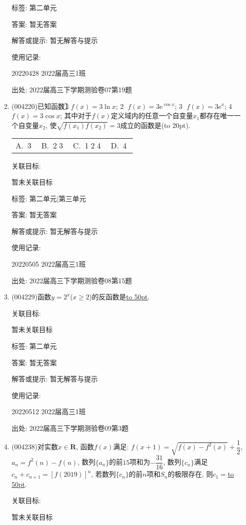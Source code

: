 \documentclass[10pt,a4paper]{article}
\newcommand{\blank}[1]{\underline{\hbox to #1pt{}}}
\newcommand{\bracket}[1]{(\hbox to #1pt{})}
\newcommand{\fourch}[4]{\par\begin{tabular}{p{.23\textwidth}p{.23\textwidth}p{.23\textwidth}p{.23\textwidth}}
A.~#1 &B.~#2& C.~#3& D.~#4
\end{tabular}}
\begin{document}
\begin{enumerate}[1.]
标签: 第二单元

答案: 暂无答案

解答或提示: 暂无解答与提示

使用记录:

20220428	2022届高三1班		


出处: 2022届高三下学期测验卷07第19题
\item { (004220)}已知函数\textcircled{1} $f(x)=3\ln x$; \textcircled{2} $f(x)=3\mathrm{e}^{\cos x}$; \textcircled{3} $f(x)=3\mathrm{e}^x$; \textcircled{4} $f(x)=3\cos x$; 其中对于$f(x)$定义域内的任意一个自变量$x_1$都存在唯一一个自变量$x_2$, 使$\sqrt{f(x_1)f(x_2)}=3$成立的函数是\bracket{20}.
\fourch{\textcircled{3}}{\textcircled{2}\textcircled{3}}{\textcircled{1}\textcircled{2}\textcircled{4}}{\textcircled{4}}


关联目标:

暂未关联目标



标签: 第二单元|第三单元

答案: 暂无答案

解答或提示: 暂无解答与提示

使用记录:

20220505	2022届高三1班	


出处: 2022届高三下学期测验卷08第15题
\item { (004229)}函数$y=2^x$($x\ge 2$)的反函数是\blank{50}.


关联目标:

暂未关联目标



标签: 第二单元

答案: 暂无答案

解答或提示: 暂无解答与提示

使用记录:

20220512	2022届高三1班	


出处: 2022届高三下学期测验卷09第3题
\item { (004238)}对实数$x\in \mathbf{R}$, 函数$f(x)$满足: $f(x+1)=\sqrt{f(x)-{f^2}(x)}+\dfrac 12$, $a_n=f^2(n)-f(n)$,
数列$\{a_n\}$的前$15$项和为$-\dfrac{31}{16}$, 数列$\{c_n\}$满足$c_n+c_{n+1}=[f(2019)]^n$, 若数列$\{c_n\}$的前$n$项和$S_n$的极限存在, 则$c_1=$\blank{50}.


关联目标:

暂未关联目标




\end{enumerate}
\end{document}
